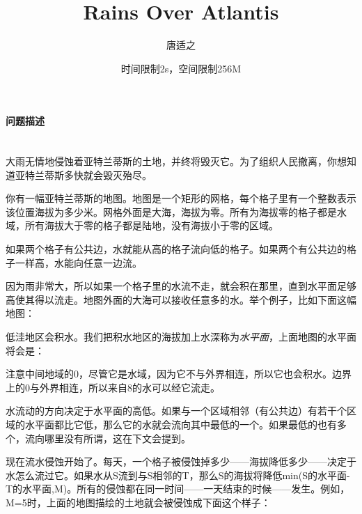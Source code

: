 \documentclass[UTF8]{ctexart}
\title{Rains Over Atlantis}
\author{唐适之}
\date{时间限制2s，空间限制256M}
\newcommand{\myparagraph}[1]{\paragraph{#1}\mbox{}\\}
\begin{document}
	
	\maketitle
	
	\myparagraph{问题描述}
		
		大雨无情地侵蚀着亚特兰蒂斯的土地，并终将毁灭它。为了组织人民撤离，你想知道亚特兰蒂斯多快就会毁灭殆尽。
		
		你有一幅亚特兰蒂斯的地图。地图是一个矩形的网格，每个格子里有一个整数表示该位置海拔为多少米。网格外面是大海，海拔为零。所有为海拔零的格子都是水域，所有海拔大于零的格子都是陆地，没有海拔小于零的区域。
		
		如果两个格子有公共边，水就能从高的格子流向低的格子。如果两个有公共边的格子一样高，水能向任意一边流。
		
		因为雨非常大，所以如果一个格子里的水流不走，就会积在那里，直到水平面足够高使其得以流走。地图外面的大海可以接收任意多的水。举个例子，比如下面这幅地图：
		
		\begin{center}\end{center}
		
		低洼地区会积水。我们把积水地区的海拔加上水深称为\emph{水平面}，上面地图的水平面将会是：
		
		\begin{center}\end{center}
		
		注意中间地域的0，尽管它是水域，因为它不与外界相连，所以它也会积水。边界上的0与外界相连，所以来自8的水可以经它流走。
		
		水流动的方向决定于水平面的高低。如果与一个区域相邻（有公共边）有若干个区域的水平面都比它低，那么它的水就会流向其中最低的一个。如果最低的也有多个，流向哪里没有所谓，这在下文会提到。
		
		现在流水侵蚀开始了。每天，一个格子被侵蚀掉多少——海拔降低多少——决定于水怎么流过它。如果水从S流到与S相邻的T，那么S的海拔将降低min(S的水平面-T的水平面,M)。所有的侵蚀都在同一时间——一天结束的时候——发生。例如，M=5时，上面的地图描绘的土地就会被侵蚀成下面这个样子：
		
		\begin{center}\end{center}
		
\end{document}
